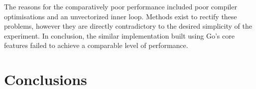 \documentclass[twocolumn, a4paper]{article}
\begin{document}
The reasons for the comparatively poor performance included poor compiler optimisations and an unvectorized inner loop.
Methods exist to rectify these problems, however they are directly contradictory to the desired simplicity of the experiment.
In conclusion, the similar implementation built using Go's core features failed to achieve a comparable level of performance.

\section{Conclusions}

\printbibliography
\end{document}

